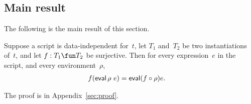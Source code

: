 
\subsection{Main result}

The following is the main result of this section.
%
\begin{prop}
\label{prop:expressions}
Suppose a script is data-independent for~$t$, let $T_1$ and~$T_2$ be two
instantiations of~$t$, and let $f : T_1 \fun T_2$ be surjective.  Then for
every expression~$e$ in the script, and every environment~$\rho$,
\begin{eqnarray*}
f(\mathop{\sf eval} \rho ~ e) & = \mathop{\sf eval} (f \circ \rho) e .
\end{eqnarray*}
\end{prop}
%
The proof is in Appendix~\ref{sec:proof}.
